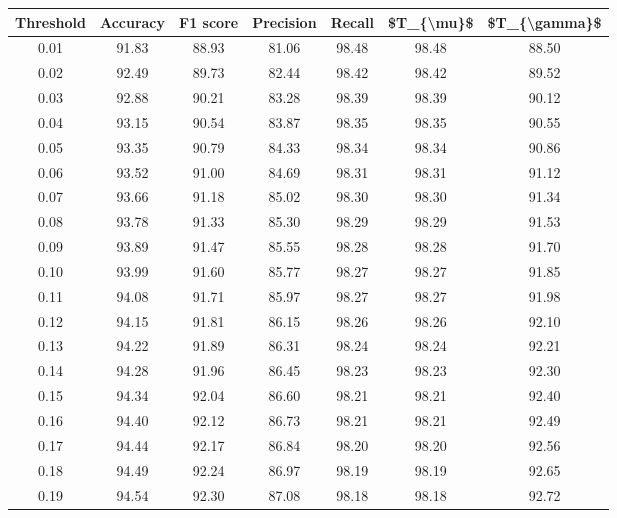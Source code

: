 \begin{tabular}{|c|c|c|c|c|c|c|}
\hline
 Threshold &  Accuracy &  F1 score &  Precision &  Recall &  \$T\_\{\textbackslash mu\}\$ &  \$T\_\{\textbackslash gamma\}\$ \\
\hline
      0.01 &     91.83 &     88.93 &      81.06 &   98.48 &      98.48 &         88.50 \\
      0.02 &     92.49 &     89.73 &      82.44 &   98.42 &      98.42 &         89.52 \\
      0.03 &     92.88 &     90.21 &      83.28 &   98.39 &      98.39 &         90.12 \\
      0.04 &     93.15 &     90.54 &      83.87 &   98.35 &      98.35 &         90.55 \\
      0.05 &     93.35 &     90.79 &      84.33 &   98.34 &      98.34 &         90.86 \\
      0.06 &     93.52 &     91.00 &      84.69 &   98.31 &      98.31 &         91.12 \\
      0.07 &     93.66 &     91.18 &      85.02 &   98.30 &      98.30 &         91.34 \\
      0.08 &     93.78 &     91.33 &      85.30 &   98.29 &      98.29 &         91.53 \\
      0.09 &     93.89 &     91.47 &      85.55 &   98.28 &      98.28 &         91.70 \\
      0.10 &     93.99 &     91.60 &      85.77 &   98.27 &      98.27 &         91.85 \\
      0.11 &     94.08 &     91.71 &      85.97 &   98.27 &      98.27 &         91.98 \\
      0.12 &     94.15 &     91.81 &      86.15 &   98.26 &      98.26 &         92.10 \\
      0.13 &     94.22 &     91.89 &      86.31 &   98.24 &      98.24 &         92.21 \\
      0.14 &     94.28 &     91.96 &      86.45 &   98.23 &      98.23 &         92.30 \\
      0.15 &     94.34 &     92.04 &      86.60 &   98.21 &      98.21 &         92.40 \\
      0.16 &     94.40 &     92.12 &      86.73 &   98.21 &      98.21 &         92.49 \\
      0.17 &     94.44 &     92.17 &      86.84 &   98.20 &      98.20 &         92.56 \\
      0.18 &     94.49 &     92.24 &      86.97 &   98.19 &      98.19 &         92.65 \\
      0.19 &     94.54 &     92.30 &      87.08 &   98.18 &      98.18 &         92.72 \\

\end{tabular}
